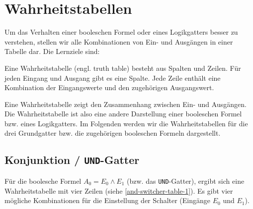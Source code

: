 
\toggletrue{image}
\togglefalse{imagehover}
\toggletrue{imagehover}


\chapter{Wahrheitstabellen}
\label{ch:wahrheitstabellen}

Um das Verhalten einer booleschen Formel oder eines Logikgatters besser zu verstehen, stellen wir alle Kombinationen von Ein- und Ausgängen in einer Tabelle dar. Die Lernziele sind:\\


\begin{definition}[Wahrheitstabelle]
Eine Wahrheitstabelle (engl. truth table) besteht aus Spalten und Zeilen. Für jeden Eingang und Ausgang gibt es eine Spalte. Jede Zeile enthält eine Kombination der Eingangswerte und den zugehörigen Ausgangswert.
\end{definition}

Eine Wahrheitstabelle zeigt den Zusammenhang zwischen Ein- und Ausgängen. Die Wahrheitstabelle ist also eine andere Darstellung einer booleschen Formel bzw. eines Logikgatters. Im Folgenden werden wir die Wahrheitstabellen für die drei Grundgatter bzw. die zugehörigen booleschen Formeln dargestellt.

\section{Konjunktion / \texttt{UND}-Gatter}

Für die boolesche Formel  $A_0=E_0 \wedge E_1$ (bzw. das \texttt{UND}-Gatter), ergibt sich eine Wahrheitstabelle mit vier Zeilen (siehe \autoref{and-switcher-table-1}). Es gibt vier mögliche Kombinationen für die Einstellung der Schalter (Eingänge $E_0$ und $E_1$).

